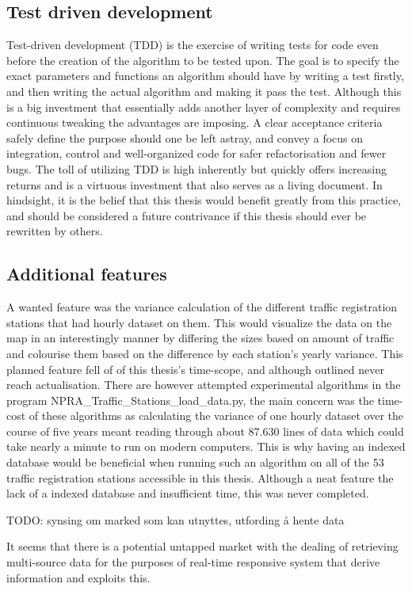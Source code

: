 \subsection{Test driven development}
Test-driven development (TDD) is the exercise of writing tests for code even before the creation of the algorithm to be tested upon. The goal is to specify the exact parameters and functions an algorithm should have by writing a test firstly, and then writing the actual algorithm and making it pass the test. Although this is a big investment that essentially adds another layer of complexity and requires continuous tweaking the advantages are imposing. A clear acceptance criteria safely define the purpose should one be left astray, and convey a focus on integration, control and well-organized code for safer refactorisation and fewer bugs. The toll of utilizing TDD is high inherently but quickly offers increasing returns and is a virtuous investment that also serves as a living document.
In hindsight, it is the belief that this thesis would benefit greatly from this practice, and should be considered a future contrivance if this thesis should ever be rewritten by others.

\subsection{Additional features}
A wanted feature was the variance calculation of the different traffic registration stations that had hourly dataset on them. This would visualize the data on the map in an interestingly manner by differing the sizes based on amount of traffic and colourise them based on the difference by each station's yearly variance. This planned feature fell of of this thesis's time-scope, and although outlined never reach actualisation. There are however attempted experimental algorithms in the program NPRA\_Traffic\_Stations\_load\_data.py, the main concern was the time-cost of these algorithms as calculating the variance of one hourly dataset over the course of five years meant reading through about 87.630 lines of data which could take nearly a minute to run on modern computers. This is why having an indexed database would be beneficial when running such an algorithm on all of the 53 traffic registration stations accessible in this thesis. Although a neat feature the lack of a indexed database and insufficient time, this was never completed.


TODO: synsing om marked som kan utnyttes, utfording å hente data

It seems that there is a potential untapped market with the dealing of retrieving multi-source data for the purposes of real-time responsive system that derive information and exploits this.
